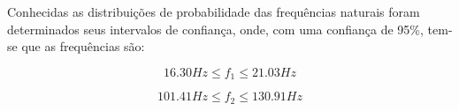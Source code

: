     Conhecidas as distribuições de probabilidade das frequências naturais
foram determinados seus intervalos de confiança, onde, com uma confiança
de 95\%, tem-se que as frequências são:

\[16.30 Hz \le f_1 \le 21.03 Hz\]

\[101.41 Hz \le f_2 \le 130.91 Hz\]


    
    
    

